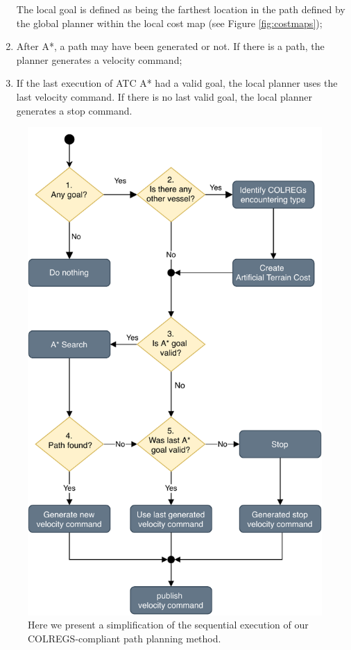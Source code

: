 \begin{enumerate}
                The local goal is defined as being the farthest location in the path defined by the global planner within the local cost map (see Figure \ref{fig:costmaps});
                
                \item After A*, a path may have been generated or not. If there is a path, the planner generates a velocity command;
                
                \item If the last execution of \ac{ATC} A* had a valid goal, the local planner uses the last velocity command. If there is no last valid goal, the local planner generates a stop command.

            \end{enumerate}
        
        \begin{figure}[H]
            \centering
        \includegraphics[scale=0.95]{figs/Chap4/local_planner_flow.pdf}
            \caption{Here we present a simplification of the sequential execution of our \ac{COLREGS}-compliant path planning method.}
            \label{fig:local_planner_flow}
        \end{figure}